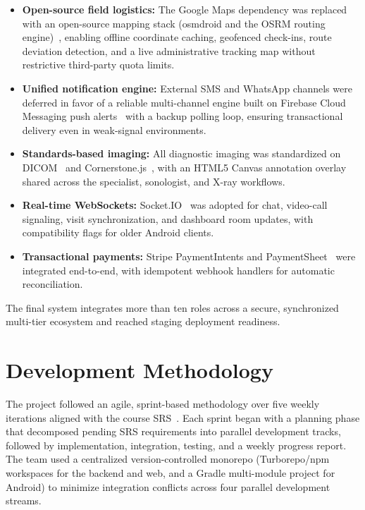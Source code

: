 \documentclass[conference]{IEEEtran}
\begin{document}
\begin{itemize}
\item \textbf{Open-source field logistics:} The Google Maps dependency was replaced with an open-source mapping stack (osmdroid and the OSRM routing engine)~\cite{osmdroid2024}, enabling offline coordinate caching, geofenced check-ins, route deviation detection, and a live administrative tracking map without restrictive third-party quota limits.
\item \textbf{Unified notification engine:} External SMS and WhatsApp channels were deferred in favor of a reliable multi-channel engine built on Firebase Cloud Messaging push alerts~\cite{firebase2024fcm} with a backup polling loop, ensuring transactional delivery even in weak-signal environments.
\item \textbf{Standards-based imaging:} All diagnostic imaging was standardized on DICOM~\cite{dicom2021} and Cornerstone.js~, with an HTML5 Canvas annotation overlay shared across the specialist, sonologist, and X-ray workflows.
\item \textbf{Real-time WebSockets:} Socket.IO~\cite{fette2011websocket} was adopted for chat, video-call signaling, visit synchronization, and dashboard room updates, with compatibility flags for older Android clients.
\item \textbf{Transactional payments:} Stripe PaymentIntents and PaymentSheet~\cite{stripe2024api} were integrated end-to-end, with idempotent webhook handlers for automatic reconciliation.
\end{itemize}

The final system integrates more than ten roles across a secure, synchronized multi-tier ecosystem and reached staging deployment readiness.

\section{Development Methodology}

The project followed an agile, sprint-based methodology over five weekly iterations aligned with the course SRS~\cite{srs2026}. Each sprint began with a planning phase that decomposed pending SRS requirements into parallel development tracks, followed by implementation, integration, testing, and a weekly progress report. The team used a centralized version-controlled monorepo (Turborepo/npm workspaces for the backend and web, and a Gradle multi-module project for Android) to minimize integration conflicts across four parallel development streams.
\end{document}
